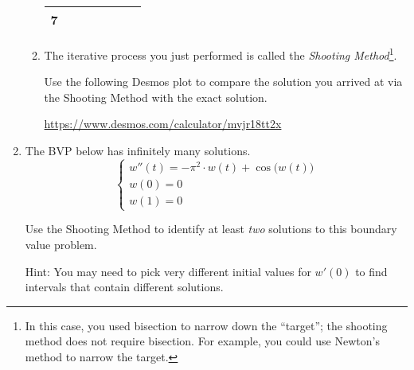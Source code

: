 \begin{enumerate}
\begin{enumerate}
\begin{tabular}{|c||c|c||c|c||c|c|}
			            7   &                                   &                                           &                      &                                          &                                    &                                          \\[10pt]\hline
		            \end{tabular}
		      \item The iterative process you just performed is called the \emph{Shooting Method}\footnote{ In this case,
			  you used bisection to narrow down the ``target''; the shooting method does not require bisection. For example,
			  you could use Newton's method to narrow the target.}.
			  
			  Use the following Desmos plot to compare the solution you arrived at via the Shooting Method 
			  with the exact solution.
			  
			 \url{https://www.desmos.com/calculator/mvjr18tt2x}
	      \end{enumerate}


	\item The BVP below has infinitely many solutions.
	      \begin{equation}\tag{$\star$}\label{BVP2}
		      \begin{cases}
			      w''(t) = -\pi^2 \cdot w(t) + \cos\Big(w(t)\Big) \\
			      w(0) = 0                   \\
			      w(1) = 0
		      \end{cases}
	      \end{equation}

	      Use the Shooting Method to identify at least \emph{two} solutions to this boundary value problem.

		  Hint: You may need to pick very different initial values for $w'(0)$ to find intervals that contain different solutions.

\end{enumerate}



